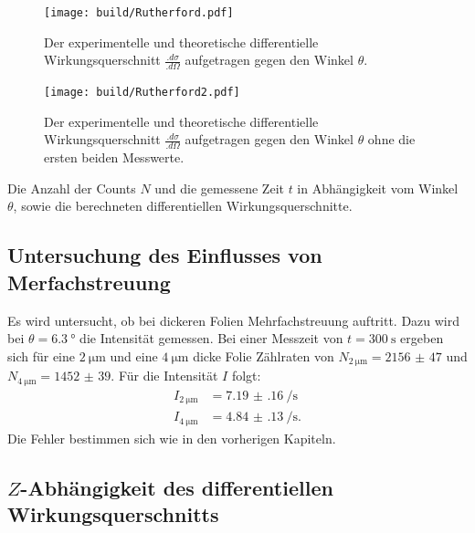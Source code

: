 \begin{figure}
\centering
\texttt{[image: build/Rutherford.pdf]}
\caption{Der experimentelle und  theoretische differentielle Wirkungsquerschnitt $\frac{.d\sigma}{.d\Omega}$ aufgetragen gegen den Winkel $\theta$.}
\label{fig:Rutherford}
\end{figure}

\begin{figure}
\centering
\texttt{[image: build/Rutherford2.pdf]}
\caption{Der experimentelle und  theoretische differentielle Wirkungsquerschnitt $\frac{.d\sigma}{.d\Omega}$ aufgetragen gegen den Winkel $\theta$ ohne die ersten beiden Messwerte.}
\label{fig:Rutherford2}
\end{figure}

\begin{table}
	\centering
	\caption{Die Anzahl der Counts $N$ und die gemessene Zeit $t$ in Abhängigkeit vom Winkel $\theta$, sowie die berechneten differentiellen Wirkungsquerschnitte.}
	
	\label{tab:dataDeg}
\end{table}

\subsection{Untersuchung des Einflusses von Merfachstreuung}

Es wird untersucht, ob bei dickeren Folien Mehrfachstreuung auftritt. Dazu wird bei $\theta=\SI{6.3}{\degree}$ die Intensität gemessen.
Bei einer Messzeit von $t=\SI{300}{\second}$ ergeben sich für eine $\SI{2}{\micro\metre}$ und eine $\SI{4}{\micro\metre}$ dicke Folie Zählraten von $N_{\SI{2}{\micro\metre}}=\num{2156(47)}$ und $N_{\SI{4}{\micro\metre}}=\num{1452(39)}$.
Für die Intensität $I$ folgt:
\begin{align*}
I_{\SI{2}{\micro\metre}} &= \SI{7.19(16)}{\per\second}\\
I_{\SI{4}{\micro\metre}} &= \SI{4.84(13)}{\per\second}\text{.}
\end{align*}
Die Fehler bestimmen sich wie in den vorherigen Kapiteln.

\subsection{$Z$-Abhängigkeit des differentiellen Wirkungsquerschnitts}

